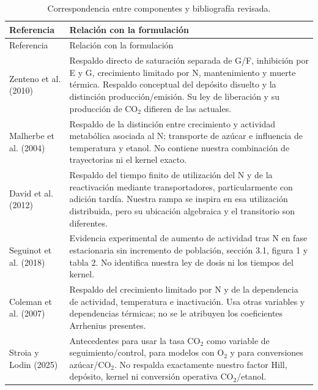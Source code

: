 \documentclass[11pt,a4paper]{article}
\begin{document}
\begin{longtable}{@{}P{3.2cm}P{11.3cm}@{}}
\caption{Correspondencia entre componentes y bibliografía revisada.}\\
\toprule Referencia & Relación con la formulación \\\midrule\endfirsthead
\toprule Referencia & Relación con la formulación \\\midrule\endhead
\bottomrule\endfoot
Zenteno et al. (2010)\newline\cite{zenteno2010} &
Respaldo directo de saturación separada de G/F, inhibición por E y G,
crecimiento limitado por N, mantenimiento y muerte térmica.
Respaldo conceptual del depósito disuelto y la distinción producción/emisión.
Su ley de liberación y su producción de CO\(_2\) difieren de las actuales.\\
Malherbe et al. (2004)\newline\cite{malherbe2004} &
Respaldo de la distinción entre crecimiento y actividad metabólica asociada
al N; transporte de azúcar e influencia de temperatura y etanol.
No contiene nuestra combinación de trayectorias ni el kernel exacto.\\
David et al. (2012)\newline\cite{david2012} &
Respaldo del tiempo finito de utilización del N y de la reactivación mediante
transportadores, particularmente con adición tardía.
Nuestra rampa se inspira en esa utilización distribuida, pero su ubicación
algebraica y el transitorio son diferentes.\\
Seguinot et al. (2018)\newline\cite{seguinot2018} &
Evidencia experimental de aumento de actividad tras N en fase estacionaria
sin incremento de población, sección 3.1, figura 1 y tabla 2.
No identifica nuestra ley de dosis ni los tiempos del kernel.\\
Coleman et al. (2007)\newline\cite{coleman2007} &
Respaldo del crecimiento limitado por N y de la dependencia de actividad,
temperatura e inactivación. Usa otras variables y dependencias térmicas;
no se le atribuyen los coeficientes Arrhenius presentes.\\
Stroia y Lodin (2025)\newline\cite{stroia2025} &
Antecedentes para usar la tasa CO\(_2\) como variable de seguimiento/control,
para modelos con O\(_2\) y para conversiones azúcar/CO\(_2\).
No respalda exactamente nuestro factor Hill, depósito, kernel ni conversión
operativa CO\(_2\)/etanol.\\

\end{longtable}
\end{document}
